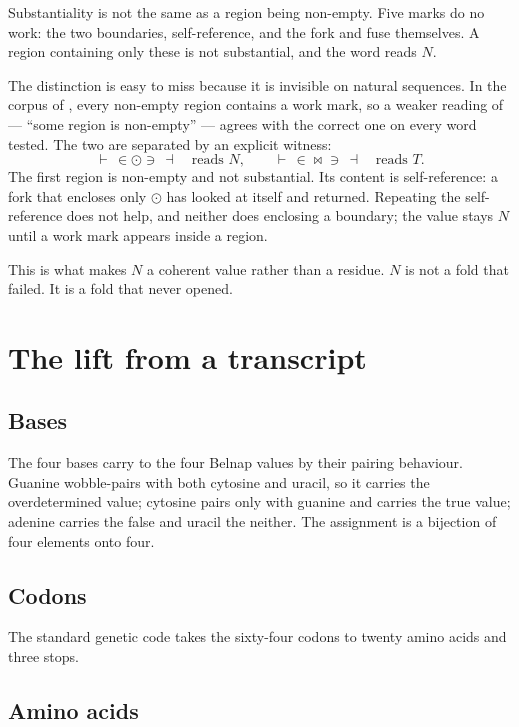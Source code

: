 \documentclass[12pt,a4paper]{article}
\begin{document}
Substantiality is not the same as a region being non-empty. Five marks do no work:
the two boundaries, self-reference, and the fork and fuse themselves. A region
containing only these is not substantial, and the word reads $N$.

The distinction is easy to miss because it is invisible on natural sequences. In the
corpus of , every non-empty region contains a work mark, so
a weaker reading of  --- ``some region is non-empty'' --- agrees
with the correct one on every word tested. The two are separated by an explicit
witness:
\[
  \vdash\, \in \odot \ni \,\dashv \quad\text{reads } N,
  \qquad
  \vdash\, \in \bowtie \ni \,\dashv \quad\text{reads } T.
\]
The first region is non-empty and not substantial. Its content is self-reference: a
fork that encloses only $\odot$ has looked at itself and returned. Repeating the
self-reference does not help, and neither does enclosing a boundary; the value stays
$N$ until a work mark appears inside a region.

This is what makes $N$ a coherent value rather than a residue. $N$ is not a fold
that failed. It is a fold that never opened.

\section{The lift from a transcript}

\subsection{Bases}

The four bases carry to the four Belnap values by their pairing behaviour. Guanine
wobble-pairs with both cytosine and uracil, so it carries the overdetermined value;
cytosine pairs only with guanine and carries the true value; adenine carries the
false and uracil the neither. The assignment is a bijection of four elements onto
four.

\subsection{Codons}

The standard genetic code \cite{crick1968, nirenberg1965} takes the sixty-four
codons to twenty amino acids and three stops.

\subsection{Amino acids}
\end{document}
